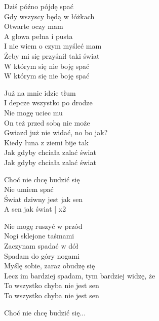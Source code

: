 \begin{text}
    \hfill\break
    Dziś późno pójdę spać\\
    Gdy wszyscy będą w łóżkach\\
    Otwarte oczy mam\\
    A głowa pełna i pusta\\
    I nie wiem o czym myśleć mam\\
    Żeby mi się przyśnił taki świat\\
    W którym się nie boję spać\\
    W którym się nie boję spać

    Już na mnie idzie tłum\\
    I depcze wszystko po drodze\\
    Nie mogę uciec mu\\
    On też przed sobą nie może\\
    Gwiazd już nie widać, no bo jak?\\
    Kiedy łuna z ziemi bije tak\\
    Jak gdyby chciała zalać świat\\
    Jak gdyby chciała zalać świat

    \vin Choć nie chcę budzić się\\
    \vin Nie umiem spać\\
    \vin Świat dziwny jest jak sen\\
    \vin A sen jak świat | x2

    Nie mogę ruszyć w przód\\
    Nogi sklejone taśmami\\
    Zaczynam spadać w dół\\
    Spadam do góry nogami\\
    Myślę sobie, zaraz obudzę się\\
    Lecz im bardziej spadam, tym bardziej widzę, że\\
    To wszystko chyba nie jest sen\\
    To wszystko chyba nie jest sen
    
    \vin Choć nie chcę budzić się...
\end{text}
